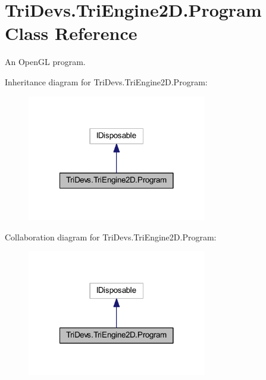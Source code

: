 \hypertarget{class_tri_devs_1_1_tri_engine2_d_1_1_program}{\section{Tri\-Devs.\-Tri\-Engine2\-D.\-Program Class Reference}
\label{class_tri_devs_1_1_tri_engine2_d_1_1_program}
}


An Open\-G\-L program.  




Inheritance diagram for Tri\-Devs.\-Tri\-Engine2\-D.\-Program\-:
\nopagebreak
\begin{figure}[H]
\begin{center}
\leavevmode
\includegraphics[width=222pt]{class_tri_devs_1_1_tri_engine2_d_1_1_program__inherit__graph}
\end{center}
\end{figure}


Collaboration diagram for Tri\-Devs.\-Tri\-Engine2\-D.\-Program\-:
\nopagebreak
\begin{figure}[H]
\begin{center}
\leavevmode
\includegraphics[width=222pt]{class_tri_devs_1_1_tri_engine2_d_1_1_program__coll__graph}
\end{center}
\end{figure}
